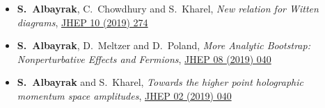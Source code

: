 \documentclass[a4paper,11pt]{article}
\begin{document}
\begin{itemize}
 \item[] {\bf S.~Albayrak}, C.~Chowdhury and  { S.~Kharel}, \emph{New relation for Witten diagrams}, \hyperref{https://inspirehep.net/files/44b75a5187c14730a849c04e3b909bd3}{}{}{JHEP 10 (2019) 274}
 
 \item[] {\bf S.~Albayrak}, D.~Meltzer and  { D.~Poland}, \emph{More Analytic Bootstrap: Nonperturbative Effects and Fermions}, \hyperref{https://inspirehep.net/files/3a3c45b7b08a2948ba1c165463f00fd0}{}{}{JHEP 08 (2019) 040}
 
 \item[] {\bf S.~Albayrak} and  { S.~Kharel}, \emph{Towards the higher point holographic momentum space amplitudes}, \hyperref{https://inspirehep.net/files/fdfe40b4cfec540b04df94d4cb9bc1c4}{}{}{JHEP 02 (2019) 040}
 \end{itemize}
\end{document}

